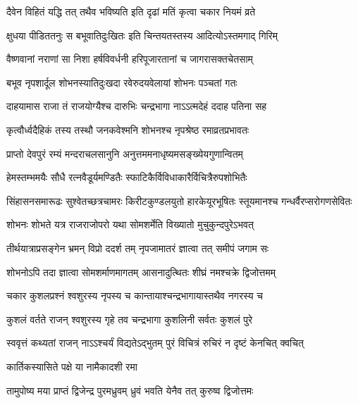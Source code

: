 \twolineshloka
{दैवेन विहितं यद्धि तत् तथैव भविष्यति}
{इति दृढां मतिं कृत्वा चकार नियमं व्रते}%

\twolineshloka
{क्षुधया पीडिततनुः स बभूवातिदुःखितः}
{इति चिन्तयतस्तस्य आदित्योऽस्तमगाद् गिरिम्}%

\twolineshloka
{वैष्णवानां नराणां सा निशा हर्षविवर्धनी}
{हरिपूजारतानां च जागरासक्तचेतसाम्}%

\twolineshloka
{बभूव नृपशार्दूल शोभनस्यातिदुःखदा}
{रवेरुदयवेलायां शोभनः पञ्चतां गतः}%

\twolineshloka
{दाहयामास राजा तं राजयोग्यैश्च दारुभिः}
{चन्द्रभागा नाऽऽत्मदेहं ददाह पतिना सह}%

\twolineshloka
{कृत्वौर्ध्वदैहिकं तस्य तस्थौ जनकवेश्मनि}
{शोभनश्च नृपश्रेष्ठ रमाव्रतप्रभावतः}%

\twolineshloka
{प्राप्तो देवपुरं रम्यं मन्दराचलसानुनि}
{अनुत्तममनाधृष्यमसङ्ख्येयगुणान्वितम्}%

\twolineshloka
{हेमस्तम्भमयैः सौधै रत्नवैडूर्यमण्डितैः}
{स्फाटिकैर्विविधाकारैर्विचित्रैरुपशोभितैः}%

\threelineshloka
{सिंहासनसमारूढः सुश्वेतच्छत्रचामरः}
{किरीटकुण्डलयुतो हारकेयूरभूषितः}
{स्तूयमानश्च गन्धर्वैरप्सरोगणसेवितः }%

\twolineshloka
{शोभनः शोभते यत्र राजराजोपरो यथा}
{सोमशर्मेति विख्यातो मुचुकुन्दपुरेऽभवत्}%

\twolineshloka
{तीर्थयात्राप्रसङ्गेन भ्रमन् विप्रो ददर्श तम्}
{नृपजामातरं ज्ञात्वा तत् समीपं जगाम सः}%

\twolineshloka
{शोभनोऽपि तदा ज्ञात्वा सोमशर्माणमागतम्}
{आसनादुत्थितः शीघ्रं नमश्चक्रे द्विजोत्तमम्}%

\twolineshloka
{चकार कुशलप्रश्नं श्वशुरस्य नृपस्य च}
{कान्तायाश्चन्द्रभागायास्तथैव नगरस्य च}%


\twolineshloka
{कुशलं वर्तते राजन् श्वशुरस्य गृहे तव}
{चन्द्रभागा कुशलिनी सर्वतः कुशलं पुरे}%

\twolineshloka
{स्ववृत्तं कथ्यतां राजन् नाऽऽश्चर्यं विद्यतेऽद्भुतम्}
{पुरं विचित्रं रुचिरं न दृष्टं केनचित् क्वचित्}%

\onelineshloka
{कार्तिकस्यासिते पक्षे या नामैकादशी रमा}%

\twolineshloka
{तामुपोष्य मया प्राप्तं द्विजेन्द्र पुरमध्रुवम्}
{ध्रुवं भवति येनैव तत् कुरुष्व द्विजोत्तमः}%


